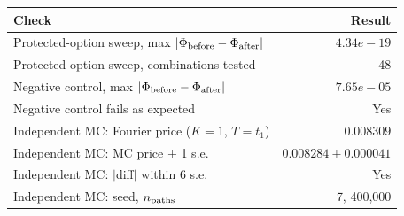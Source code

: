 \begin{tabular}{lr}
\toprule
Check & Result \\
\midrule
Protected-option sweep, max $|\Phi_{\rm before}-\Phi_{\rm after}|$ & $4.34e-19$ \\
Protected-option sweep, combinations tested & 48 \\
Negative control, max $|\Phi_{\rm before}-\Phi_{\rm after}|$ & $7.65e-05$ \\
Negative control fails as expected & Yes \\
Independent MC: Fourier price ($K=1$, $T=t_1$) & $0.008309$ \\
Independent MC: MC price $\pm$ 1 s.e. & $0.008284 \pm 0.000041$ \\
Independent MC: $|$diff$|$ within 6 s.e. & Yes \\
Independent MC: seed, $n_{\rm paths}$ & 7, 400,000 \\
\bottomrule
\end{tabular}
